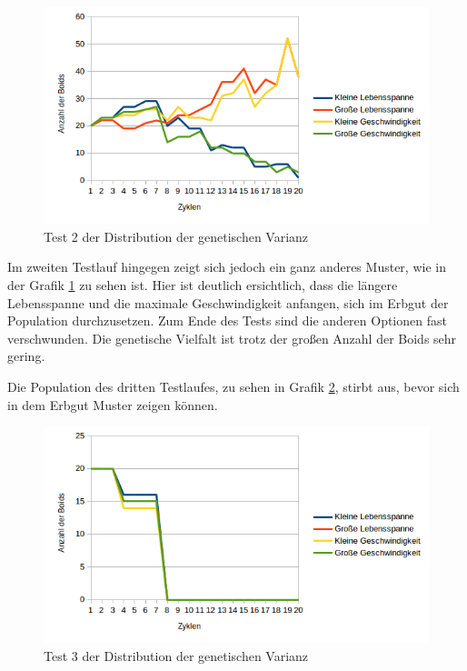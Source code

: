 \documentclass[draft=false
              ,paper=a4
              ,twoside=false
              ,fontsize=11pt
              ,headsepline
              ,BCOR10mm
              ,DIV11
              ,bibtotoc
              ,liststotoc
              ]{scrbook}
\begin{document}
\begin{figure}[!h]
\centering
\includegraphics[scale=0.80]{project/Test2-Genetik.png}
\caption{Test 2 der Distribution der genetischen Varianz}
\label{test2genetik}
\end{figure}

Im zweiten Testlauf hingegen zeigt sich jedoch ein ganz anderes Muster, wie in der Grafik \ref{test2genetik} zu sehen ist. Hier ist deutlich ersichtlich, dass die längere Lebensspanne und die maximale Geschwindigkeit anfangen, sich im Erbgut der Population durchzusetzen. Zum Ende des Tests sind die anderen Optionen fast verschwunden. Die genetische Vielfalt ist trotz der großen Anzahl der Boids sehr gering.

Die Population des dritten Testlaufes, zu sehen in Grafik \ref{test3genetik}, stirbt aus, bevor sich in dem Erbgut Muster zeigen können.

\begin{figure}[!h]
\centering
\includegraphics[scale=0.80]{project/Test3-Genetik.png}
\caption{Test 3 der Distribution der genetischen Varianz}
\label{test3genetik}
\end{figure}
\end{document}
